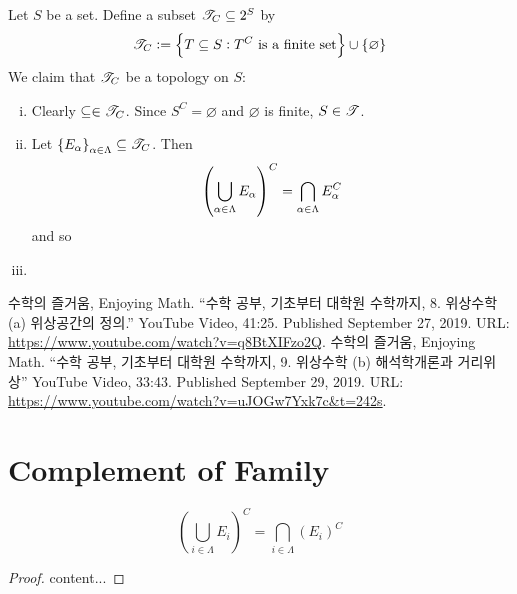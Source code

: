 \documentclass[11pt,openany]{article}
\begin{document}
\begin{example}
	Let $S$ be a set. Define a subset $\mathscr{T}_C\subseteq 2^S$ by \[
	\mathscr{T}_C:=\set{T\subseteq S:T^C\ \text{is a finite set}}\cup\set{\varnothing}
	\] We claim that $\mathscr{T}_C$ be a topology on $S$:
	\begin{enumerate}[(i)]
		\item Clearly $\subseteq\in\mathscr{T}_C$. Since $S^C=\varnothing$ and $\varnothing$ is finite, $S\in\mathscr{T}$.
		\item Let $\set{E_\alpha}_{\alpha\in\Lambda}\subseteq\mathscr{T}_C$. Then \[
		\left( \bigcup_{\alpha\in\Lambda} E_\alpha \right)^C=\bigcap_{\alpha\in\Lambda}E_\alpha^C
		\] and so
		\item 
	\end{enumerate}
\end{example}

\begin{example}
	
\end{example}

\begin{example}
	
\end{example}


\newpage
{}


\vfill
\begin{thebibliography}{9}
	수학의 즐거움, Enjoying Math. ``수학 공부, 기초부터 대학원 수학까지, 8. 위상수학 (a) 위상공간의 정의.'' YouTube Video, 41:25. Published 
	September 27, 2019. URL: \url{https://www.youtube.com/watch?v=q8BtXIFzo2Q}.
	수학의 즐거움, Enjoying Math. ``수학 공부, 기초부터 대학원 수학까지, 9. 위상수학 (b) 해석학개론과 거리위상'' YouTube Video, 33:43. Published 
	September 29, 2019. URL: \url{https://www.youtube.com/watch?v=uJOGw7Yxk7c&t=242s}.
\end{thebibliography}
\appendix
\section{Complement of Family}
\begin{note}
	\[
	\left(\bigcup_{i\in\Lambda}E_i\right)^C=
	\bigcap_{i\in\Lambda}\left(E_i\right)^C
	\]
	\begin{proof}
		content...
	\end{proof}
\end{note}
\end{document}
